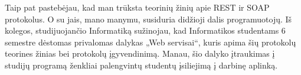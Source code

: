 Taip pat pastebėjau, kad man trūksta teorinių žinių apie REST ir SOAP protokolus. O su jais, mano manymu, susiduria didžioji dalis programuotojų.
Iš kolegos, studijuojančio Informatiką sužinojau, kad Informatikos studentams 6 semestre dėstomas privalomas dalykas „Web servisai“,
kuris apima šių protokolų teorines žinias bei protokolų įgyvendinimą. Manau, šio dalyko įtraukimas į studijų programą ženkliai palengvintų studentų įsiliejimą į darbinę aplinką.
